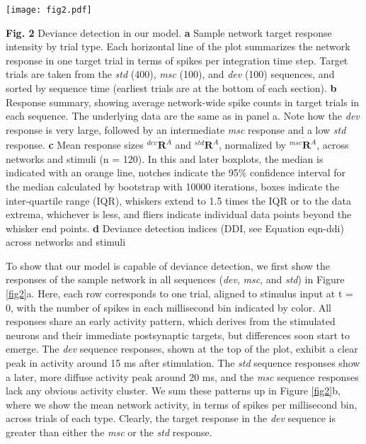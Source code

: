 \documentclass[pdflatex,referee,iicol,sn-basic]{sn-jnl}
\newcommand{\dev}{\textit{dev}}
\newcommand{\msc}{\textit{msc}}
\newcommand{\std}{\textit{std}}
\renewcommand{\R}[3][]{{}^{#1}_{}\!\mathbf{R}^{#2}_{#3}}
\newcommand{\mean}[1]{\overline{#1}}
\theoremstyle{thmstyleone}%
\theoremstyle{thmstyletwo}%
\theoremstyle{thmstylethree}%
\begin{document}
\begin{figure*}%
    \centering
    \texttt{[image: fig2.pdf]}
    \caption{}
    \label{fig2}
\end{figure*}
\textbf{Fig. 2} Deviance detection in our model. \textbf{a} Sample network target response intensity by trial type. Each horizontal line of the plot summarizes the network response in one target trial in terms of spikes per integration time step. Target trials are taken from the \std{} (400), \msc{} (100), and \dev{} (100) sequences, and sorted by sequence time (earliest trials are at the bottom of each section). \textbf{b} Response summary, showing average network-wide spike counts in target trials in each sequence. The underlying data are the same as in panel a. Note how the \dev{} response is very large, followed by an intermediate \msc{} response and a low \std{} response.
\textbf{c} Mean response sizes $\mean{\R[dev]{A}{}}$ and $\mean{\R[std]{A}{}}$, normalized by $\mean{\R[msc]{A}{}}$, across networks and stimuli (n = 120). In this and later boxplots, the median is indicated with an orange line, notches indicate the 95\% confidence interval for the median calculated by bootstrap with 10000 iterations, boxes indicate the inter-quartile range (IQR), whiskers extend to 1.5 times the IQR or to the data extrema, whichever is less, and fliers indicate individual data points beyond the whisker end points.
\textbf{d} Deviance detection indices (DDI, see Equation {eqn-ddi}) across networks and stimuli

To show that our model is capable of deviance detection, we first show the responses of the sample network in all sequences (\dev{}, \msc{}, and \std{}) in Figure \ref{fig2}a. Here, each row corresponds to one trial, aligned to stimulus input at t = 0, with the number of spikes in each millisecond bin indicated by color. All responses share an early activity pattern, which derives from the stimulated neurons and their immediate postsynaptic targets, but differences soon start to emerge. The \dev{} sequence responses, shown at the top of the plot, exhibit a clear peak in activity around 15 ms after stimulation. The \std{} sequence responses show a later, more diffuse activity peak around 20 ms, and the \msc{} sequence responses lack any obvious activity cluster. We sum these patterns up in Figure \ref{fig2}b, where we show the mean network activity, in terms of spikes per millisecond bin, across trials of each type. Clearly, the target response in the \dev{} sequence is greater than either the \msc{} or the \std{} response.
\end{document}
